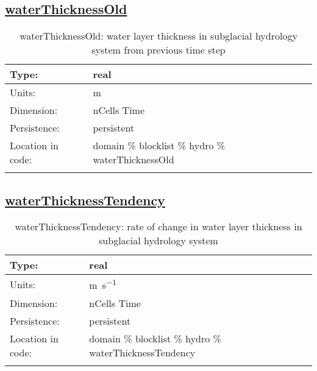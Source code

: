 \subsection[waterThicknessOld]{\hyperref[sec:var_tab_hydro]{waterThicknessOld}}
\label{subsec:var_sec_hydro_waterThicknessOld}
\begin{center}
\begin{longtable}{| p{2.0in} | p{4.0in} |}
        \hline 
        Type: & real \\
        \hline 
        Units: & \si{m} \\
        \hline 
        Dimension: & nCells Time \\
        \hline 
        Persistence: & persistent \\
        \hline 
         Location in code: & domain \% blocklist \% hydro \% waterThicknessOld \\
         \hline 
    \caption{waterThicknessOld: water layer thickness in subglacial hydrology system from previous time step}
\end{longtable}
\end{center}
\subsection[waterThicknessTendency]{\hyperref[sec:var_tab_hydro]{waterThicknessTendency}}
\label{subsec:var_sec_hydro_waterThicknessTendency}
\begin{center}
\begin{longtable}{| p{2.0in} | p{4.0in} |}
        \hline 
        Type: & real \\
        \hline 
        Units: & \si{m.s^{-1}} \\
        \hline 
        Dimension: & nCells Time \\
        \hline 
        Persistence: & persistent \\
        \hline 
         Location in code: & domain \% blocklist \% hydro \% waterThicknessTendency \\
         \hline 
    \caption{waterThicknessTendency: rate of change in water layer thickness in subglacial hydrology system}
\end{longtable}
\end{center}
